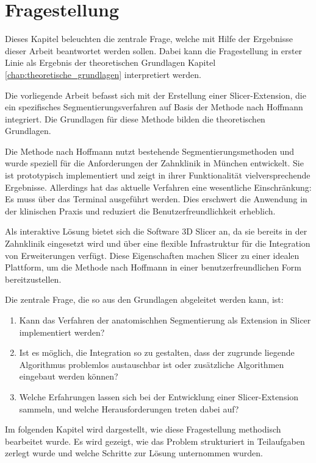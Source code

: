 \chapter{Fragestellung}
\label{chap:fragestellung} Dieses Kapitel beleuchten die zentrale Frage, welche
mit Hilfe der Ergebnisse dieser Arbeit beantwortet werden sollen. Dabei kann die
Fragestellung in erster Linie als Ergebnis der theoretischen Grundlagen Kapitel \ref{chap:theoretische_grundlagen}
interpretiert werden.

Die vorliegende Arbeit befasst sich mit der Erstellung einer Slicer-Extension,
die ein spezifisches Segmentierungsverfahren auf Basis der Methode nach Hoffmann
integriert. Die Grundlagen für diese Methode bilden die theoretischen Grundlagen.

Die Methode nach Hoffmann nutzt bestehende Segmentierungsmethoden und wurde speziell
für die Anforderungen der Zahnklinik in München entwickelt. Sie ist prototypisch
implementiert und zeigt in ihrer Funktionalität vielversprechende Ergebnisse. Allerdings
hat das aktuelle Verfahren eine wesentliche Einschränkung: Es muss über das
Terminal ausgeführt werden. Dies erschwert die Anwendung in der klinischen Praxis
und reduziert die Benutzerfreundlichkeit erheblich.

Als interaktive Lösung bietet sich die Software 3D Slicer an, da sie bereits in
der Zahnklinik eingesetzt wird und über eine flexible Infrastruktur für die
Integration von Erweiterungen verfügt. Diese Eigenschaften machen Slicer zu einer
idealen Plattform, um die Methode nach Hoffmann in einer benutzerfreundlichen
Form bereitzustellen.

Die zentrale Frage, die so aus den Grundlagen abgeleitet werden kann, ist:

\begin{enumerate}
	\item Kann das Verfahren der anatomischhen Segmentierung als Extension in Slicer
		implementiert werden?

	\item Ist es möglich, die Integration so zu gestalten, dass der zugrunde liegende
		Algorithmus problemlos austauschbar ist oder zusätzliche Algorithmen eingebaut
		werden können?

	\item Welche Erfahrungen lassen sich bei der Entwicklung einer Slicer-Extension
		sammeln, und welche Herausforderungen treten dabei auf?
\end{enumerate}

Im folgenden Kapitel wird dargestellt, wie diese Fragestellung methodisch
bearbeitet wurde. Es wird gezeigt, wie das Problem strukturiert in Teilaufgaben
zerlegt wurde und welche Schritte zur Lösung unternommen wurden.
